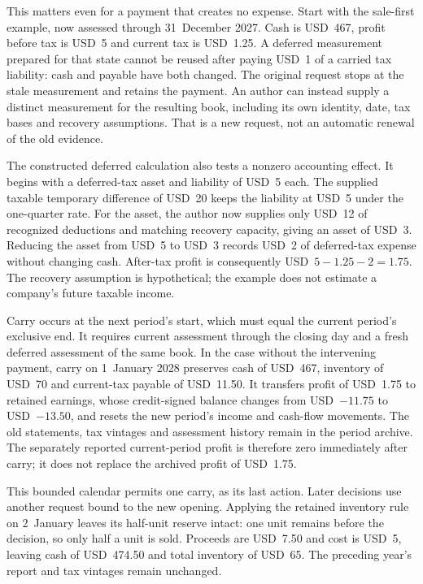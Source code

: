 This matters even for a payment that creates no expense. Start with the
sale-first example, now assessed through 31~December 2027. Cash is USD~467,
profit before tax is USD~5 and current tax is USD~1.25. A deferred measurement
prepared for that state cannot be reused after paying USD~1 of a carried tax
liability: cash and payable have both changed. The original request stops at
the stale measurement and retains the payment. An author can instead supply
a distinct measurement for the resulting book, including its own identity,
date, tax bases and recovery assumptions. That is a new request, not an
automatic renewal of the old evidence.

The constructed deferred calculation also tests a nonzero accounting effect.
It begins with a deferred-tax asset and liability of USD~5 each. The supplied
taxable temporary difference of USD~20 keeps the liability at USD~5 under
the one-quarter rate. For the asset, the author now supplies only USD~12 of
recognized deductions and matching recovery capacity, giving an asset of
USD~3. Reducing the asset from USD~5 to USD~3 records USD~2 of deferred-tax
expense without changing cash. After-tax profit is consequently
USD~$5-1.25-2=1.75$. The recovery assumption is hypothetical; the example
does not estimate a company's future taxable income.

Carry occurs at the next period's start, which must equal the current period's
exclusive end. It requires current assessment through the closing day and a
fresh deferred assessment of the same book. In the case without the intervening
payment, carry on 1~January 2028 preserves cash of USD~467, inventory of USD~70
and current-tax payable of USD~11.50. It transfers profit of USD~1.75 to retained
earnings, whose credit-signed balance changes from USD~$-11.75$ to
USD~$-13.50$, and resets the new period's income and cash-flow movements.
The old statements, tax vintages and assessment history remain in the period
archive. The separately reported current-period profit is therefore zero
immediately after carry; it does not replace the archived profit of USD~1.75.

This bounded calendar permits one carry, as its last action. Later decisions
use another request bound to the new opening. Applying the retained inventory
rule on 2~January leaves its half-unit reserve intact: one unit remains before
the decision, so only half a unit is sold. Proceeds are USD~7.50 and cost is
USD~5, leaving cash of USD~474.50 and total inventory of USD~65. The preceding
year's report and tax vintages remain unchanged.

